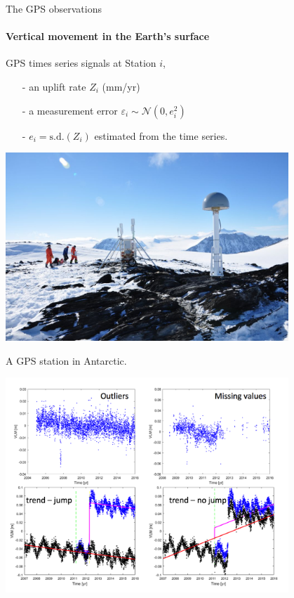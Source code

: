 \documentclass{beamer}
\begin{document}
\begin{frame}{The GPS observations}
\framesubtitle{Vertical movement in the Earth's surface}
\vspace{0.3cm}
GPS times series signals at Station $i$,
\begin{itemize}
\item[-] an uplift rate $Z_i$ (mm/yr)
\item[-] a measurement error  $\varepsilon_i \sim \mathcal{N}(0, e_i^2)$
\item[-] $e_i = \mbox{s.d.}(Z_i)$ estimated from the time series.
\end{itemize} 

\begin{minipage}[c]{0.4\textwidth}
\centering
\includegraphics[width=0.8\textwidth]{images/GPSstation}

\tiny{A GPS station in Antarctic.}
\end{minipage}%
\hfill
\begin{minipage}[c]{0.6\textwidth}
\centering
\includegraphics[width=0.8\textwidth]{images/GPSts}
\end{minipage}


\end{frame}
\end{document}
